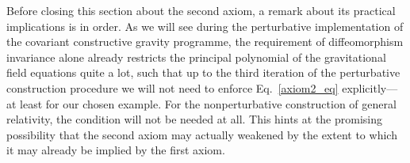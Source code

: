 Before closing this section about the second axiom, a remark about its practical implications is in order. As we will see during the perturbative implementation of the covariant constructive gravity programme, the requirement of diffeomorphism invariance alone already restricts the principal polynomial of the gravitational field equations quite a lot, such that up to the third iteration of the perturbative construction procedure we will not need to enforce Eq.~\ref{axiom2_eq} explicitly---at least for our chosen example. For the nonperturbative construction of general relativity, the condition will not be needed at all. This hints at the promising possibility that the second axiom may actually weakened by the extent to which it may already be implied by the first axiom.

